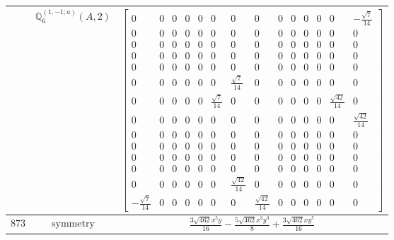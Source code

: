 \documentclass[fleqn,8pt,landscape]{jsarticle}
\begin{document}
\begin{longtable}{ccc}
$  $ & $ \mathbb{Q}_{6}^{(1,-1;a)}(A,2) $ & $ \begin{bmatrix} 0 & 0 & 0 & 0 & 0 & 0 & 0 & 0 & 0 & 0 & 0 & 0 & 0 & - \frac{\sqrt{7}}{14} \\ 0 & 0 & 0 & 0 & 0 & 0 & 0 & 0 & 0 & 0 & 0 & 0 & 0 & 0 \\ 0 & 0 & 0 & 0 & 0 & 0 & 0 & 0 & 0 & 0 & 0 & 0 & 0 & 0 \\ 0 & 0 & 0 & 0 & 0 & 0 & 0 & 0 & 0 & 0 & 0 & 0 & 0 & 0 \\ 0 & 0 & 0 & 0 & 0 & 0 & 0 & 0 & 0 & 0 & 0 & 0 & 0 & 0 \\ 0 & 0 & 0 & 0 & 0 & 0 & \frac{\sqrt{7}}{14} & 0 & 0 & 0 & 0 & 0 & 0 & 0 \\ 0 & 0 & 0 & 0 & 0 & \frac{\sqrt{7}}{14} & 0 & 0 & 0 & 0 & 0 & 0 & \frac{\sqrt{42}}{14} & 0 \\ 0 & 0 & 0 & 0 & 0 & 0 & 0 & 0 & 0 & 0 & 0 & 0 & 0 & \frac{\sqrt{42}}{14} \\ 0 & 0 & 0 & 0 & 0 & 0 & 0 & 0 & 0 & 0 & 0 & 0 & 0 & 0 \\ 0 & 0 & 0 & 0 & 0 & 0 & 0 & 0 & 0 & 0 & 0 & 0 & 0 & 0 \\ 0 & 0 & 0 & 0 & 0 & 0 & 0 & 0 & 0 & 0 & 0 & 0 & 0 & 0 \\ 0 & 0 & 0 & 0 & 0 & 0 & 0 & 0 & 0 & 0 & 0 & 0 & 0 & 0 \\ 0 & 0 & 0 & 0 & 0 & 0 & \frac{\sqrt{42}}{14} & 0 & 0 & 0 & 0 & 0 & 0 & 0 \\ - \frac{\sqrt{7}}{14} & 0 & 0 & 0 & 0 & 0 & 0 & \frac{\sqrt{42}}{14} & 0 & 0 & 0 & 0 & 0 & 0 \end{bmatrix} $ \\ \hline
$ 873 $ & $ \text{symmetry} $ & $ \frac{3 \sqrt{462} x^{5} y}{16} - \frac{5 \sqrt{462} x^{3} y^{3}}{8} + \frac{3 \sqrt{462} x y^{5}}{16} $ \\

\end{longtable}
\end{document}
